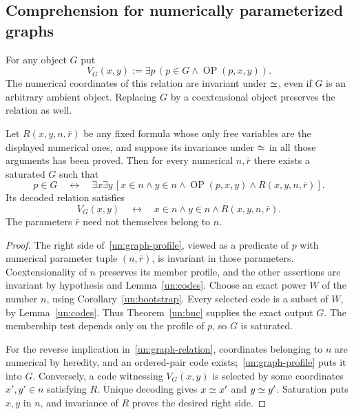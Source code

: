 \subsection{Comprehension for numerically parameterized graphs}

For any object $G$ put
\[
       V_G(x,y):=\exists p\,(p\in G\land\operatorname{OP}(p,x,y)).
\]
The numerical coordinates of this relation are invariant under $\mathrel{\simeq}$,
even if $G$ is an arbitrary ambient object. Replacing $G$ by a
coextensional object preserves the relation as well.

\begin{theorem}\label{un:graphs}
Let $R(x,y,n,\bar r)$ be any fixed formula whose only free variables
are the displayed numerical ones, and suppose its invariance under
$\mathrel{\simeq}$ in all those arguments has been proved. Then for every numerical
$n,\bar r$ there exists a saturated $G$ such that
\begin{equation}\label{un:graph-profile}
 p\in G\quad\longleftrightarrow\quad
 \exists x\exists y\,
 [x\in n\land y\in n\land\operatorname{OP}(p,x,y)
                                  \land R(x,y,n,\bar r)].
\end{equation}
Its decoded relation satisfies
\begin{equation}\label{un:graph-relation}
 V_G(x,y)\quad\longleftrightarrow\quad
              x\in n\land y\in n\land R(x,y,n,\bar r).
\end{equation}
The parameters $\bar r$ need not themselves belong to $n$.
\end{theorem}
\begin{proof}
The right side of~\eqref{un:graph-profile}, viewed as a predicate of
$p$ with numerical parameter tuple $(n,\bar r)$, is invariant in those
parameters. Coextensionality of $n$ preserves its member profile, and
the other assertions are invariant by hypothesis and
Lemma~\ref{un:codes}. Choose an exact power $W$ of the number $n$,
using Corollary~\ref{un:bootstrap}. Every selected code is a subset of
$W$, by Lemma~\ref{un:codes}. Thus Theorem~\ref{un:bnc} supplies
the exact output $G$. The membership test depends only on the profile
of $p$, so $G$ is saturated.

For the reverse implication in~\eqref{un:graph-relation}, coordinates
belonging to $n$ are numerical by heredity, and an ordered-pair code
exists;~\eqref{un:graph-profile} puts it into $G$. Conversely, a code
witnessing $V_G(x,y)$ is selected by some coordinates $x',y'\in n$
satisfying $R$. Unique decoding gives $x\mathrel{\simeq} x'$ and $y\mathrel{\simeq} y'$.
Saturation puts $x,y$ in $n$, and invariance of $R$ proves the desired
right side.
\end{proof}

